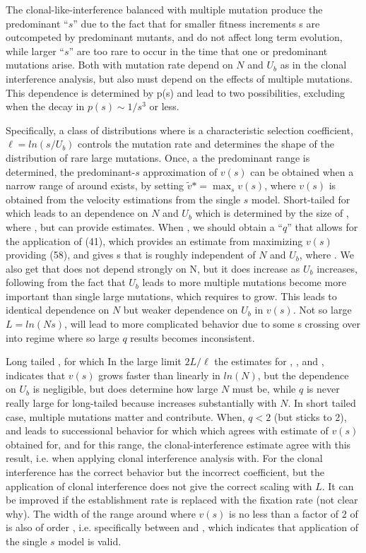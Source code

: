 \documentclass[12pt]{article}
\begin{document}
The clonal-like-interference balanced with multiple mutation produce the predominant “$s$” due to the fact that for smaller fitness increments s are outcompeted by predominant mutants, and do not affect long term evolution, while larger “$s$” are too rare to occur in the time that one or predominant mutations arise.  Both  with mutation rate  depend on $N$ and $U_b$ as in the clonal interference analysis, but also must depend on the effects of multiple mutations.  This dependence is determined by p(s) and lead to two possibilities, excluding when the decay in $p(s) \sim 1/s^3$  or less.

Specifically, a class of distributions where is a characteristic selection coefficient, $\ell=ln(s/U_b)$ controls the mutation rate and determines the shape of the distribution of rare large mutations. Once, a the predominant range is determined, the predominant-$s$ approximation of $v(s)$ can be obtained when a narrow range of around exists, by setting $\tilde{v}* = \max_{s} v(s)$, where $v(s)$ is obtained from the velocity estimations from the single $s$ model.  Short-tailed for which leads to an dependence on $N$ and $U_b$ which is determined by  the size of , where , but can provide estimates.
When , we should obtain a “$q$” that allows for the application of (41), which provides an estimate  from maximizing $v(s)$ providing (58), and gives s that is roughly independent of $N$ and $U_b$, where .  
We also get that does not depend strongly on N, but it does increase as $U_b$ increases, following from the fact that $U_b$ leads to more multiple mutations become more important than single large mutations, which requires to grow.
This leads to identical dependence on $N$ but weaker dependence on $U_b$ in $v(s)$.
Not so large $L=ln(Ns)$, will lead to more complicated behavior due to some s crossing over into regime where so large $q$ results becomes inconsistent.

Long tailed , for which 
In the large limit $2L/\ell$ the estimates for , , and , indicates that $v(s)$ grows faster than linearly in $ln(N)$, but the dependence on $U_b$ is negligible, but does determine how large $N$ must be, while $q$ is never really large for long-tailed because  increases substantially with $N$.  In short tailed case, multiple mutations matter and contribute.
When, $q<2$ (but sticks to 2), and leads to successional behavior for which which agrees with estimate of $v(s)$ obtained for, and for this range, the clonal-interference estimate agree with this result, i.e. when applying clonal interference analysis with.  
For the clonal interference has the correct behavior but the incorrect coefficient, but the application of clonal interference does not give the correct scaling with $L$.  It can be improved if the establishment rate is replaced with the fixation rate (not clear why).  The width of the range around where $v(s)$ is no less than a factor of 2 of is also of order , i.e. specifically between and , which indicates that application of the single $s$ model is valid.
\end{document}

